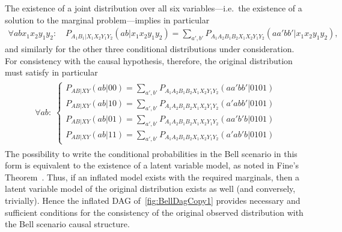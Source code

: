 The existence of a joint distribution over all six variables---i.e.~the existence of a solution to the marginal problem---implies in particular
\begin{align}
	\forall{a b x_1 x_2 y_1 y_2}: \quad P_{A_1 B_1 | X_1 X_2 Y_1 Y_2}(a b | x_1 x_2 y_1 y_2)  =  \sum\nolimits_{a',b'} P_{A_1 A_2 B_1 B_2 X_1 X_2 Y_1 Y_2}(a a' b b'|x_1 x_2 y_1 y_2),
\end{align}
and similarly for the other three conditional distributions under consideration. For consistency with the causal hypothesis, therefore, the original distribution must satisfy in particular
\begin{align}\begin{split}\label{eq:finalBellstep}\forall{a b}:\; \begin{cases}
	P_{A B | X Y}(a b | 0 0)  =  \sum\nolimits_{a',b'} P_{A_1 A_2 B_1 B_2 X_1 X_2 Y_1 Y_2}(a a' b b'|0101) \\
	P_{A B | X Y}(a b | 1 0)  =  \sum\nolimits_{a',b'} P_{A_1 A_2 B_1 B_2 X_1 X_2 Y_1 Y_2}(a' a b b'|0101) \\
	P_{A B | X Y}(a b | 0 1)  =  \sum\nolimits_{a',b'} P_{A_1 A_2 B_1 B_2 X_1 X_2 Y_1 Y_2}(a a' b' b|0101) \\
	P_{A B | X Y}(a b | 1 1)  =  \sum\nolimits_{a',b'} P_{A_1 A_2 B_1 B_2 X_1 X_2 Y_1 Y_2}(a' a b' b|0101)
\end{cases}\end{split}\end{align}
The possibility to write the conditional probabilities in the Bell scenario in this form is equivalent to the existence of a latent variable model, as noted in Fine's Theorem~\cite{FineTheorem}. Thus, if an inflated model exists with the required marginals, then a latent variable model of the original distribution exists as well (and conversely, trivially). Hence the inflated DAG of~\cref{fig:BellDagCopy1} provides necessary and sufficient conditions for the consistency of the original observed distribution with the Bell scenario causal structure.


